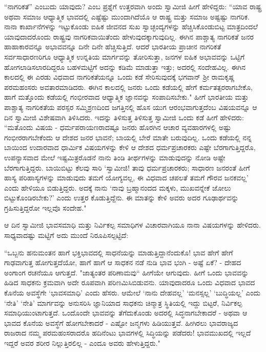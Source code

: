 “ನಾಗರಿಕತೆ” ಎಂಬುದು ಯಾವುದು? ಎಂಬ ಪ್ರಶ್ನೆಗೆ ಉತ್ತರವಾಗಿ ಅಂದು ಸ್ವಾಮೀಜಿ ಹೀಗೆ ಹೇಳಿದ್ದರು: “ಯಾವ ರಾಷ್ಟ್ರ ಅಥವಾ ಸಮಾಜ ಆಧ್ಯಾತ್ಮಿಕ ಭಾವದಲ್ಲಿ ಎಷ್ಟೆಷ್ಟು ಮುಂದಾಗಿದೆಯೊ ಆ ರಾಷ್ಟ್ರ ಮತ್ತು ಸಮಾಜ ಅಷ್ಟಷ್ಟು ನಾಗರಿಕ. ನಾನಾ ಕಾರ್ಖಾನೆಗಳನ್ನು ಇಟ್ಟುಕೊಂಡು ಐಹಿಕ ಜೀವನದ ಸುಖ ಸ್ವಾಚ್ಛಂದ್ಯಗಳನ್ನು ಹೆಚ್ಚಿಸಿಕೊಂಡುಬಿಟ್ಟ ಮಾತ್ರದಿಂದಲೆ ಯಾವುದಾದರೊಂದು ರಾಷ್ಟ್ರವು ನಾಗರಿಕವಾಯಿತೆಂದು ಹೇಳುವುದಕ್ಕಾಗುವುದಿಲ್ಲ. ಈಗಿನ ಪಾಶ್ಚಾತ್ಯ ನಾಗರಿಕತೆ ಜನರ ಹಾಹಾಕಾರವನ್ನೂ ಅಭಾವವನ್ನೂ ದಿನೇ ದಿನೇ ಹೆಚ್ಚಿಸುತ್ತಿದೆ. ಆದರೆ ಭಾರತೀಯ ಪ್ರಾಚೀನ ನಾಗರಿಕತೆ ಸರ್ವಸಾಧಾರಣರಿಗೂ ಆಧ್ಯಾತ್ಮಿಕ ಉನ್ನತಿಯ ಮಾರ್ಗವನ್ನು ತೋರಿಸುತ್ತಾ, ಜನಗಳ ಐಹಿಕ ಅಭಾವವನ್ನು ಒಟ್ಟಿಗೆ ಹೋಗಲಾಡಿಸಲಾರದಿದ್ದರೂ ಬಹಳಮಟ್ಟಿಗೆ ಅದನ್ನು ಕಡಿಮೆ ಮಾಡುತ್ತಾ ಇತ್ತು; ಅದರಲ್ಲಿ ಸಂದೇಹವಿಲ್ಲ. ಈಗಿನ ಕಾಲದಲ್ಲಿ ಈ ಎರಡು ವಿಧವಾದ ನಾಗರಿಕತೆಯನ್ನೂ ಒಂದು ಕಡೆ ಸೇರಿಸುವುದಕ್ಕೆ ಭಗವಾನ್ ಶ‍್ರೀ ರಾಮಕೃಷ್ಣ ಪರಮಹಂಸರು ಅವತಾರಮಾಡಿದರು. ಈಗಿನ ಕಾಲದಲ್ಲಿ ಜನರು ಒಂದು ಕಡೆಯಲ್ಲಿ ಹೇಗೆ ಕರ್ಮತತ್ಪರರಾಗಬೇಕೊ, ಹಾಗೆ ಮತ್ತೊಂದು ಕಡೆಯಲ್ಲಿ ಗಂಭೀರವಾದ ಆಧ್ಯಾತ್ಮಿಕ ಜ್ಞಾನವನ್ನು ಸಂಪಾದಿಸಬೇಕು." ಹೀಗೆ ಭಾರತೀಯ ಮತ್ತು ಪಾಶ್ಚಾತ್ಯ ನಾಗರಿಕತೆಯ ಪರಸ್ಪರ ಸಮ್ಮಿಶ್ರಣದಿಂದ ಜಗತ್ತಿನಲ್ಲಿ ಹೊಸ ಯುಗ ಆರಂಭವಾಗುತ್ತದೆಂಬ ವಿಷಯವನ್ನೂ ಆ ದಿನ ಸ್ವಾಮೀಜಿ ವಿಶೇಷವಾಗಿ ತಿಳಿಸಿದರು. ಇದನ್ನು ತಿಳಿಸುತ್ತ ತಿಳಿಸುತ್ತ ಸ್ವಾಮೀಜಿ ಒಂದು ಕಡೆ ಹೀಗೆ ಹೇಳಿದರು: “ಮತೊಂದು ವಿಷಯ - ಧರ್ಮಪರಾಯಣರಾದಷ್ಟೂ ಜನರು ಹೊರಗಿನ ಆಚಾರ ವ್ಯವಹಾರಗಳಲ್ಲಿ ಅಷ್ಟು ಗಂಭೀರರಾಗಬೇಕೆಂದು ಆ ದೇಶದ ಜನರ ಭಾವನೆ; ಬಾಯಲ್ಲಿ ಬೇರೆ ಮಾತೇ ಬರುವುದಿಲ್ಲ. ಒಂದು ಕಡೆಯಲ್ಲಿ ನನ್ನ ಬಾಯಿಂದ ಉದಾರವಾದ ಧಾರ್ಮಿಕ ವಿಷಯಗಳನ್ನು ಕೇಳಿ ಆ ದೇಶದ ಧರ್ಮಪ್ರಚಾರಕರು ಎಷ್ಟೇ ಬೆರಗಾಗುತ್ತಿದ್ದರೊ, ಉಪನ್ಯಾಸವಾದ ಮೇಲೆ ಇಷ್ಟಮಿತ್ರರೊಡನೆ ನಾನು ತಿಂಡಿ ತೀರ್ಥಗಳನ್ನು ಮಾಡುವುದನ್ನು ನೋಡಿ ಅಷ್ಟೇ ಬೆರಗಾಗುತ್ತಿದ್ದರು. ಬಾಯಿಬಿಟ್ಟು ಕೆಲವು ಸಾರಿ ‘ಸ್ವಾಮೀಜಿ! ತಾವು ಧರ್ಮಪ್ರಚಾರಕರು; ಸಾಧಾರಣ ಜನರಂತೆ ಹೀಗೆ ಹಾಸ್ಯ ಪರಿಹಾಸ್ಯಗಳನ್ನು ಮಾಡುವುದು ತಮಗೆ ಯೋಗ್ಯವಲ್ಲ, ಈ ವಿಧವಾದ ಚಪಲತೆ ತಮಗೆ ಗೌರವ ಜನಕವಲ್ಲ’ ಎಂದು ಹೇಳಿಯೂ ಬಿಡುತ್ತಿದ್ದರು. ಅದಕ್ಕೆ ನಾನು ‘ನಾವು ಬ್ರಹ್ಮಾನಂದದ ಮಕ್ಕಳು, ಮುಖವನ್ನೇಕೆ ಜೋಲು ಬಿಟ್ಟುಕೊಂಡಿರಬೇಕು?’ ಎಂದು ಉತ್ತರ ಕೊಡುತ್ತಿದ್ದೆನು. ಈ ಮಾತನ್ನು ಕೇಳಿ ಅವರು ಅದರ ಗೂಢಾರ್ಥವನ್ನು ಗ್ರಹಿಸುತ್ತಿದ್ದರೋ ಇಲ್ಲವೊ ಸಂದೇಹ."

ಆ ದಿನ ಸ್ವಾಮೀಜಿ ಭಾವಸಮಾಧಿ ಮತ್ತು ನಿರ್ವಿಕಲ್ಪ ಸಮಾಧಿಗಳ ವಿಚಾರವಾಗಿಯೂ ನಾನಾ ವಿಷಯಗಳನ್ನು ಹೇಳಿದರು. ಸಾಧ್ಯವಾದಷ್ಟು ಮಟ್ಟಿಗೆ ಅದು ಮುಂದೆ ನಿರೂಪಿಸಲ್ಪಟ್ಟಿದೆ:

“ಒಬ್ಬನು ಹನುಮಂತನ ಹಾಗೆ ಭಕ್ತಿಭಾವದಲ್ಲಿ ಸಾಧನೆಯನ್ನು ಮಾಡುತ್ತಿದ್ದಾನೆಂದುಕೊ! ಭಾವ ಹೇಗೆ ಹೇಗೆ ಗಾಢವಾಗುತ್ತ ಹೋಗುತ್ತದೆಯೋ, ಹಾಗೆ ಹಾಗೆ ಆ ಸಾಧಕನ ನಡೆ ನುಡಿ ಭಾವ ಭಂಗಿ - ಅಷ್ಟೆ ಏಕೆ? - ದೇಹದ ಅಂಗಾಂಗ ರಚನೆಯೂ ಆಗುತ್ತದೆ. "ಜಾತ್ಯಂತರ ಪರಿಣಾಮವು“ ಹೀಗೆಯೇ ಆಗುವುದು. ಹೀಗೆ ಒಂದು ಭಾವವನ್ನು ಹಿಡಿದ ಸಾಧಕನು ಕ್ರಮವಾಗಿ ಅದೇ ರೂಪವಾಗಿ ಪರಿಣಮಿಸಿಬಿಡುವನು. ಯಾವುದಾದರೂ ಒಂದು ವಿಧವಾದ ಭಾವದ ಕೊನೆಯ ಅವಸ್ಥೆಗೇ ‘ಭಾವಸಮಾಧಿ’ ಎಂದು ಹೆಸರು. ಆಮೇಲೆ ‘ನಾನು ದೇಹವಲ್ಲ’ ‘ಮನಸ್ಸಲ್ಲ’ ‘ಬುದ್ಧಿಯಲ್ಲ’ ಎಂದು ‘ನೇತಿ’ ‘ನೇತಿ’ ಮಾರ್ಗವನ್ನು ಅನುಸರಿಸಿ ಜ್ಞಾನಿಯಾದ ಸಾಧಕನು ಚಿನ್ಮಾತ್ರ ಸ್ಥಿತಿಯಲ್ಲಿ ಇದ್ದು ಬಿಟ್ಟರೆ, ನಿರ್ವಿಕಲ್ಪ ಸಮಾಧಿಯುಂಟಾಗುತ್ತದೆ. ಒಂದೊಂದೇ ಭಾವವನ್ನು ತೆಗೆದುಕೊಂಡು ಅದರಲ್ಲಿ ಸಿದ್ಧನಾಗಬೇಕಾದರೆ - ಅಥವಾ ಆ ಭಾವದ ಕೊನೆಯ ಅವಸ್ಥೆಗೆ ಹೋಗಬೇಕಾದರೆ - ಎಷ್ಟೋ ಜನ್ಮಗಳು ಹಿಡಿಯುತ್ತವೆ. ಹೀಗಿರಲು ಭಾವರಾಜ್ಯದ ರಾಜರಾದ ನಮ್ಮ ಪರಮಹಂಸರಾದರೊ ಹದಿನೆಂಟು ಭಾವಗಳಲ್ಲಿ ಸಿದ್ಧಿಯನ್ನು ಪಡೆದರು! ಭಾವಮುಖದಲ್ಲಿ ಇಲ್ಲದೆ ಇದ್ದರೆ ಅವರ ಶರೀರ ನಿಲ್ಲುತ್ತಿರಲಿಲ್ಲ - ಎಂದೂ ಅವರು ಹೇಳುತ್ತಿದ್ದರು."

